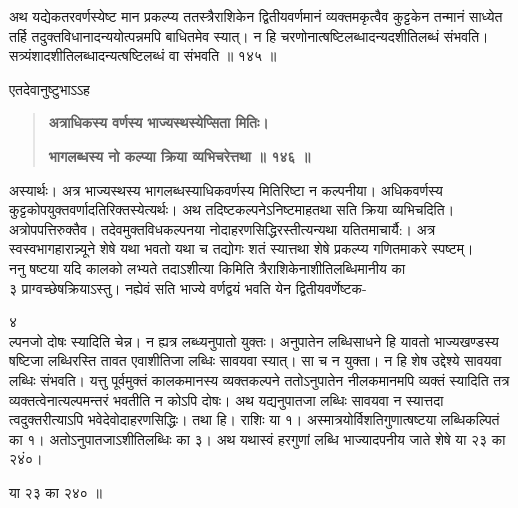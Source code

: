 \documentclass[11pt, openany]{book}
\begin{document}
\begin{sloppypar}
\hangindent=0.2in \hspace{0.2in}अथ यद्येकतरवर्णस्येष्ट मान प्रकल्प्य ततस्त्रैराशिकेन द्वितीयवर्णमानं व्यक्तमकृत्वैव कुट्टकेन  तन्मानं साध्येत तर्हि तदुक्तविधानादन्ययोत्पन्नमपि बाधितमेव स्यात्। न हि चरणोनात्षष्टिलब्धादन्यदशीतिलब्धं संभवति। सत्र्यंशादशीतिलब्धादन्यत्षष्टिलब्धं वा संभवति ॥ १४५ ॥

\hangindent=0.2in \hspace{0.2in}एतदेवानुष्टुभाऽऽह\textendash

\begin{quote}
\hspace{1in}\textbf{अत्राधिकस्य वर्णस्य भाज्यस्थस्येप्सिता मितिः।}

\hspace{1in}\textbf{भागलब्धस्य नो कल्प्या क्रिया व्यभिचरेत्तथा ॥ १४६ ॥}
\end{quote}

\hangindent=0.2in \hspace{0.2in}अस्यार्थः। अत्र भाज्यस्थस्य भागलब्धस्याधिकवर्णस्य मितिरिष्टा न कल्पनीया। अधिकवर्णस्य कुट्टकोपयुक्तवर्णादतिरिक्तस्येत्यर्थः। अथ तदिष्टकल्पनेऽनिष्टमाह\textendash तथा सति क्रिया व्यभिचदिति। अत्रोपपत्तिरुक्तैव। तदेवमुक्तविधकल्पनया नोदाहरणसिद्धिरस्तीत्यन्यथा यतितमाचार्यै:। अत्र स्वस्वभागहारान्न्यूने शेषे यथा भवतो यथा च तद्योगः शतं स्यात्तथा शेषे प्रकल्प्य गणितमाकरे स्पष्टम्।\\

\hangindent=0.2in \hspace{0.2in}ननु षष्टया यदि कालको लभ्यते तदाऽशीत्या किमिति त्रैराशिकेनाशीतिलब्धिमानीय का \\३ प्राग्वच्छेषक्रियाऽस्तु। नह्येवं सति भाज्ये वर्णद्वयं भवति येन द्वितीयवर्णेष्टक-

४\\

\hangindent=0.2in ल्पनजो दोषः स्यादिति चेन्न। न ह्यत्र लब्ध्यनुपातो युक्तः। अनुपातेन लब्धिसाधने हि यावतो भाज्यखण्डस्य षष्टिजा लब्धिरस्ति तावत एवाशीतिजा लब्धिः सावयवा स्यात्। सा च न युक्ता। न हि शेष उद्देश्ये सावयवा लब्धिः संभवति। यत्तु पूर्वमुक्तं कालकमानस्य व्यक्तकल्पने ततोऽनुपातेन नीलकमानमपि व्यक्तं स्यादिति तत्र व्यक्तत्वेनात्यल्पमन्तरं भवतीति न कोऽपि दोषः। अथ यद्यनुपातजा लब्धिः सावयवा न स्यात्तदा त्वदुक्तरीत्याऽपि भवेदेवोदाहरणसिद्धिः। तथा हि। राशिः या १। अस्मात्रयोर्विशतिगुणात्षष्टया लब्धिकल्पितं का १। अतोऽनुपातजाऽशीतिलब्धिः का ३। अथ यथास्वं हरगुणां लब्धि भाज्यादपनीय जाते शेषे या २३ का २४ं०।

\hspace{2.85in}या २३ का २४० ॥\\


\end{sloppypar}
\end{document}
